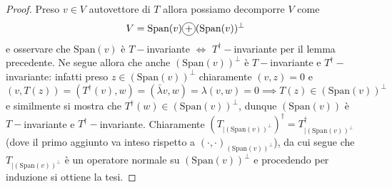 \documentclass[12pt, twoside, italian, openany]{book}
\begin{document}
	\begin{proof}
	Preso $v \in V$ autovettore di $T$ allora possiamo decomporre $V$ come
	$$
		V = \text{Span}(v) \circled{+} (\text{Span}(v))^\perp
	$$
	e osservare che $\text{Span}(v)$ è $T-$invariante $\iff$ $T^{\dag}-$invariante per il lemma precedente. Ne segue allora che anche $(\text{Span}(v))^{\perp}$ è $T-$invariante e $T^{\dag}-$invariante: infatti preso $z \in (\text{Span}(v))^\perp$ chiaramente $(v, z) = 0$ e
	$$
	(v, T(z)) = (T^{\dag}(v), w) = (\bar{\lambda}v, w) = \lambda(v, w) = 0 \implies T(z) \in (\text{Span}(v))^{\perp}
	$$
	e similmente si mostra che $T^{\dag}(w) \in (\text{Span}(v))^{\perp}$, dunque $(\text{Span}(v))$ è $T-$invariante e $T^{\dag}-$invariante. Chiaramente $(T_{|(\text{Span}(v))^\perp})^{\dag} = T^{\dag}_{|(\text{Span}(v))^\perp}$ (dove il primo aggiunto va inteso rispetto a $(\cdot, \cdot)_{(\text{Span}(v))^\perp}$), da cui segue che $T_{|(\text{Span}(v))^\perp}$ è un operatore normale su $(\text{Span}(v))^\perp$ e procedendo per induzione si ottiene la tesi.
	\end{proof}
\end{document}
